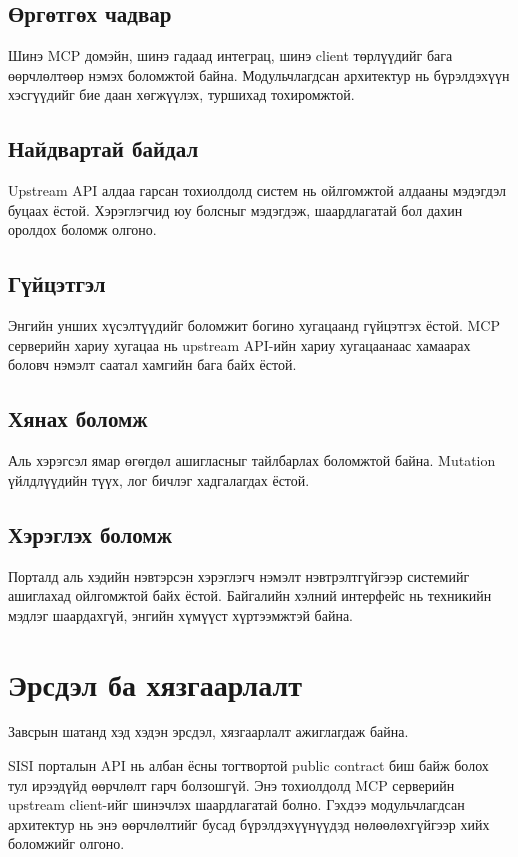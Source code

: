 \subsection{Өргөтгөх чадвар}

Шинэ MCP домэйн, шинэ гадаад интеграц, шинэ client төрлүүдийг бага өөрчлөлтөөр нэмэх боломжтой байна. Модульчлагдсан архитектур нь бүрэлдэхүүн хэсгүүдийг бие даан хөгжүүлэх, туршихад тохиромжтой.

\subsection{Найдвартай байдал}

Upstream API алдаа гарсан тохиолдолд систем нь ойлгомжтой алдааны мэдэгдэл буцаах ёстой. Хэрэглэгчид юу болсныг мэдэгдэж, шаардлагатай бол дахин оролдох боломж олгоно.

\subsection{Гүйцэтгэл}

Энгийн унших хүсэлтүүдийг боломжит богино хугацаанд гүйцэтгэх ёстой. MCP серверийн хариу хугацаа нь upstream API-ийн хариу хугацаанаас хамаарах боловч нэмэлт саатал хамгийн бага байх ёстой.

\subsection{Хянах боломж}

Аль хэрэгсэл ямар өгөгдөл ашигласныг тайлбарлах боломжтой байна. Mutation үйлдлүүдийн түүх, лог бичлэг хадгалагдах ёстой.

\subsection{Хэрэглэх боломж}

Порталд аль хэдийн нэвтэрсэн хэрэглэгч нэмэлт нэвтрэлтгүйгээр системийг ашиглахад ойлгомжтой байх ёстой. Байгалийн хэлний интерфейс нь техникийн мэдлэг шаардахгүй, энгийн хүмүүст хүртээмжтэй байна.

\section{Эрсдэл ба хязгаарлалт}

Завсрын шатанд хэд хэдэн эрсдэл, хязгаарлалт ажиглагдаж байна.

SISI порталын API нь албан ёсны тогтвортой public contract биш байж болох тул ирээдүйд өөрчлөлт гарч болзошгүй. Энэ тохиолдолд MCP серверийн upstream client-ийг шинэчлэх шаардлагатай болно. Гэхдээ модульчлагдсан архитектур нь энэ өөрчлөлтийг бусад бүрэлдэхүүнүүдэд нөлөөлөхгүйгээр хийх боломжийг олгоно.


